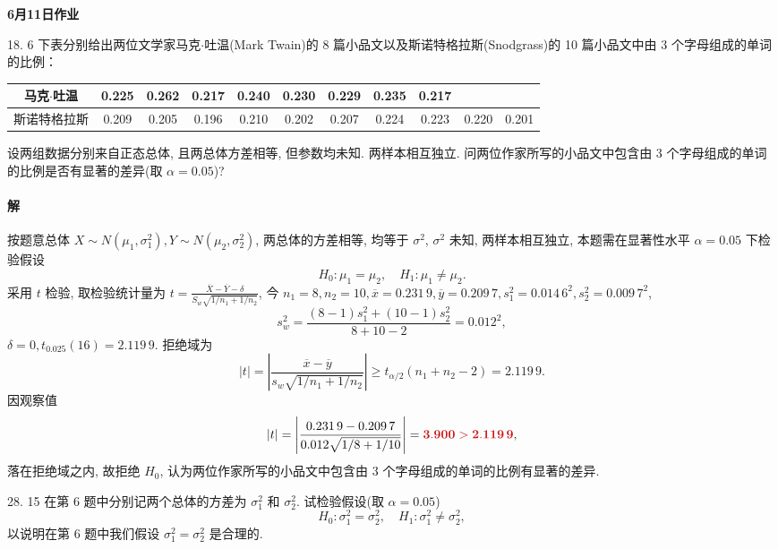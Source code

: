 \documentclass[11pt, UTF8]{ctexart}
\newcommand{\hwdate}{6月11日}
\newcommand{\ans}[1]{\mathbf{\color{fred}#1}}
\begin{document}
\begin{center}
    {\LARGE \bfseries \color{fblue} \hwdate 作业}
\end{center}

\begin{problem}{1}{8. 6}
下表分别给出两位文学家马克$\cdot$吐温(Mark Twain)的 8 篇小品文以及斯诺特格拉斯(Snodgrass)的 10 篇小品文中由 3 个字母组成的单词的比例：

\begin{center}
\begin{tabular}{c|cccccccccc}
马克$\cdot$吐温 & 0.225 & 0.262 & 0.217 & 0.240 & 0.230 & 0.229 & 0.235 & 0.217 & & \\
\hline
斯诺特格拉斯 & 0.209 & 0.205 & 0.196 & 0.210 & 0.202 & 0.207 & 0.224 & 0.223 & 0.220 & 0.201
\end{tabular}
\end{center}

设两组数据分别来自正态总体, 且两总体方差相等, 但参数均未知. 两样本相互独立. 问两位作家所写的小品文中包含由 3 个字母组成的单词的比例是否有显著的差异(取 $\alpha=0.05$)?
\end{problem}

\paragraph{\color{fblue}解} 
按题意总体 $X \sim N(\mu_1, \sigma_1^2), Y \sim N(\mu_2, \sigma_2^2)$, 两总体的方差相等, 均等于 $\sigma^2$, $\sigma^2$ 未知, 两样本相互独立, 本题需在显著性水平 $\alpha=0.05$ 下检验假设
\[ H_0: \mu_1 = \mu_2, \quad H_1: \mu_1 \neq \mu_2. \]
采用 $t$ 检验, 取检验统计量为 $t = \frac{\overline{X} - \overline{Y} - \delta}{S_w\sqrt{1/n_1 + 1/n_2}}$, 今 $n_1 = 8, n_2 = 10, \overline{x} = 0.231\,9, \overline{y} = 0.209\,7, s_1^2 = 0.014\,6^2, s_2^2 = 0.009\,7^2$, 
\[ s_w^2 = \frac{(8-1)s_1^2 + (10-1)s_2^2}{8+10-2} = 0.012^2, \]
$\delta=0, t_{0.025}(16)=2.119\,9$. 拒绝域为
\[ |t| = \left| \frac{\overline{x} - \overline{y}}{s_w\sqrt{1/n_1 + 1/n_2}} \right| \geqslant t_{\alpha/2}(n_1+n_2-2) = 2.119\,9. \]
因观察值
\[ |t| = \left| \frac{0.231\,9 - 0.209\,7}{0.012\sqrt{1/8 + 1/10}} \right| = \ans{3.900 > 2.119\,9}, \]
落在拒绝域之内, 故拒绝 $H_0$, 认为两位作家所写的小品文中包含由 3 个字母组成的单词的比例有显著的差异.

\vspace{1.5em}

\begin{problem}{2}{8. 15}
在第 6 题中分别记两个总体的方差为 $\sigma_1^2$ 和 $\sigma_2^2$. 试检验假设(取 $\alpha=0.05$)
\[ H_0: \sigma_1^2 = \sigma_2^2, \quad H_1: \sigma_1^2 \neq \sigma_2^2, \]
以说明在第 6 题中我们假设 $\sigma_1^2 = \sigma_2^2$ 是合理的.
\end{problem}
\end{document}
